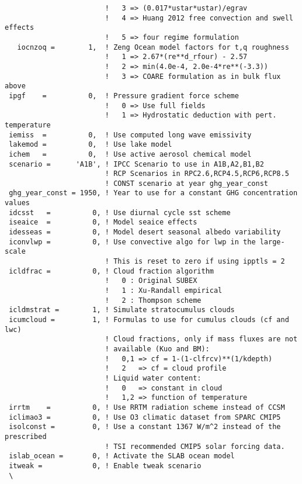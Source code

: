 {\begin{Verbatim}
                        !   3 => (0.017*ustar*ustar)/egrav
                        !   4 => Huang 2012 free convection and swell effects
                        !   5 => four regime formulation
   iocnzoq =        1,  ! Zeng Ocean model factors for t,q roughness
                        !   1 => 2.67*(re**d_rfour) - 2.57
                        !   2 => min(4.0e-4, 2.0e-4*re**(-3.3))
                        !   3 => COARE formulation as in bulk flux above
 ipgf    =          0,  ! Pressure gradient force scheme
                        !   0 => Use full fields
                        !   1 => Hydrostatic deduction with pert. temperature
 iemiss  =          0,  ! Use computed long wave emissivity
 lakemod =          0,  ! Use lake model
 ichem   =          0,  ! Use active aerosol chemical model
 scenario =      'A1B', ! IPCC Scenario to use in A1B,A2,B1,B2
                        ! RCP Scenarios in RPC2.6,RCP4.5,RCP6,RCP8.5
                        ! CONST scenario at year ghg_year_const
 ghg_year_const = 1950, ! Year to use for a constant GHG concentration values
 idcsst   =          0, ! Use diurnal cycle sst scheme
 iseaice  =          0, ! Model seaice effects
 idesseas =          0, ! Model desert seasonal albedo variability
 iconvlwp =          0, ! Use convective algo for lwp in the large-scale
                        ! This is reset to zero if using ipptls = 2
 icldfrac =          0, ! Cloud fraction algorithm
                        !   0 : Original SUBEX
                        !   1 : Xu-Randall empirical
                        !   2 : Thompson scheme
 icldmstrat =        1, ! Simulate stratocumulus clouds
 icumcloud =         1, ! Formulas to use for cumulus clouds (cf and lwc)
                        ! Cloud fractions, only if mass fluxes are not
                        ! available (Kuo and BM):
                        !   0,1 => cf = 1-(1-clfrcv)**(1/kdepth)
                        !   2   => cf = cloud profile
                        ! Liquid water content:
                        !   0   => constant in cloud
                        !   1,2 => function of temperature
 irrtm    =          0, ! Use RRTM radiation scheme instead of CCSM
 iclimao3 =          0, ! Use O3 climatic dataset from SPARC CMIP5
 isolconst =         0, ! Use a constant 1367 W/m^2 instead of the prescribed
                        ! TSI recommended CMIP5 solar forcing data.
 islab_ocean =       0, ! Activate the SLAB ocean model
 itweak =            0, ! Enable tweak scenario
 \
\end{Verbatim}
}

